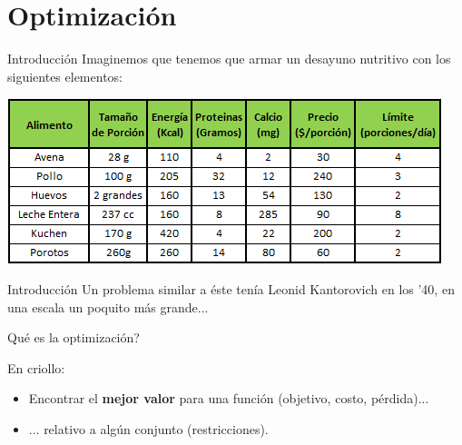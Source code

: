 \documentclass[12pt,aspectratio=169]{beamer}
\begin{document}
\section{Optimización}
\begin{frame}{Introducción}
Imaginemos que tenemos que armar un desayuno nutritivo con los siguientes elementos:

\begin{center}
\includegraphics[width=.8\paperwidth]{desayuno.png}
\end{center}
\end{frame}

\begin{frame}{Introducción}
Un problema similar a éste tenía Leonid Kantorovich en los '40, en una escala un poquito más grande...

\begin{center}
\end{center}
\end{frame}

\begin{frame}{Qué es la optimización?}

En criollo:
\begin{itemize}
\item Encontrar el \textbf{mejor valor} para una función (objetivo, costo, pérdida)...
\item ... relativo a algún conjunto (restricciones).

\end{itemize}

\end{frame}
\end{document}
